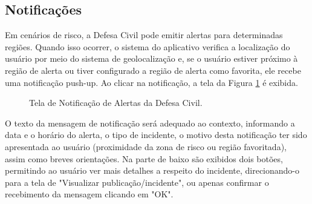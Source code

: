 \documentclass[12pt]{article}
\begin{document}
\subsection{Notificações}\label{subsec:Secnotificacao}
Em cenários de risco, a Defesa Civil pode emitir alertas para determinadas regiões. Quando isso ocorrer, o sistema do aplicativo verifica a localização do usuário por meio do sistema de geolocalização e, se o usuário estiver próximo à região de alerta ou tiver configurado a região de alerta como favorita, ele recebe uma notificação push-up. Ao clicar na notificação, a tela da Figura \ref{fig:alerta} é exibida.

\begin{figure}[h!]
  \caption{Tela de Notificação de Alertas da Defesa Civil.}
  \label{fig:alerta}
\end{figure}

\vfill%
\pagebreak%

O texto da mensagem de notificação será adequado ao contexto, informando a data e o horário do alerta, o tipo de incidente, o motivo desta notificação ter sido apresentada ao usuário (proximidade da zona de risco ou região favoritada), assim como breves orientações. Na parte de baixo são exibidos dois botões, permitindo ao usuário ver mais detalhes a respeito do incidente, direcionando-o para a tela de "Visualizar publicação/incidente", ou apenas confirmar o recebimento da mensagem clicando em "OK". 
\end{document}
